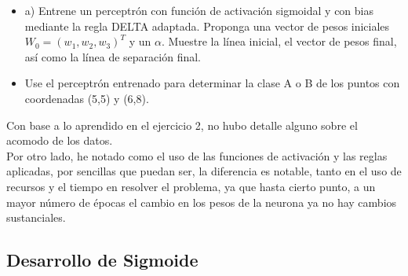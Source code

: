 \begin{itemize}
    \item a)	Entrene un perceptrón con función de activación sigmoidal y con bias mediante la regla DELTA adaptada. Proponga una vector de pesos iniciales $W_0=(w_1,w_2,w_3 )^T$ y un $\alpha$. Muestre la línea inicial, el vector de pesos final, así como la línea de separación final.
	\item Use el perceptrón entrenado para determinar la clase A o B de los puntos con coordenadas (5,5) y (6,8).
\end{itemize}

Con base a lo aprendido en el ejercicio 2, no hubo detalle alguno sobre el acomodo de los datos. 
\\
Por otro lado, he notado como el uso de las funciones de activación y las reglas aplicadas, por sencillas que puedan ser, la diferencia es notable, tanto en el uso de recursos y el tiempo en resolver el problema, ya que hasta cierto punto, a un mayor número de épocas el cambio en los pesos de la neurona ya no hay cambios sustanciales.

\newpage
\subsection{Desarrollo de Sigmoide}

\clearpage